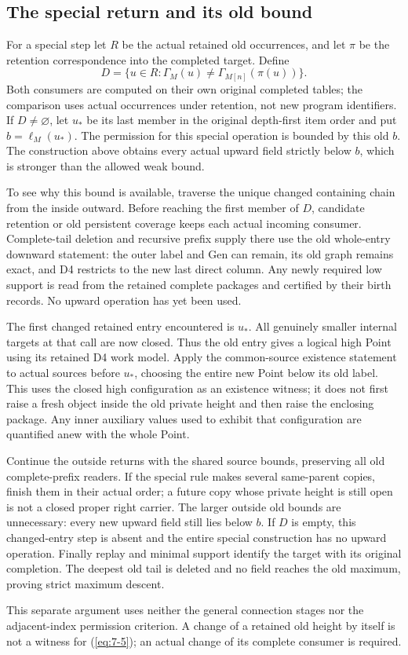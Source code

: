 \subsection{The special return and its old bound}\label{sec:special-details}
For a special step let $R$ be the actual retained old occurrences, and
let $\pi$ be the retention correspondence into the completed target.
Define
\begin{equation}\label{eq:7-5}
 D=\{u\in R:\Gamma_M(u)\ne\Gamma_{M[n]}(\pi(u))\}.
\end{equation}
Both consumers are computed on their own original completed tables;
the comparison uses actual occurrences under retention, not new program
identifiers. If $D\ne\varnothing$, let $u_*$ be its last member in
the original depth-first item order and put $b=\ell_M(u_*)$.
The permission for this special operation is bounded by this old $b$.
The construction above obtains every actual upward field strictly below
$b$, which is stronger than the allowed weak bound.

To see why this bound is available, traverse the unique changed
containing chain from the inside outward. Before reaching the first
member of $D$, candidate retention or old persistent coverage keeps
each actual incoming consumer. Complete-tail deletion and recursive
prefix supply there use the old whole-entry downward statement: the
outer label and Gen can remain, its old graph remains exact, and D4
restricts to the new last direct column. Any newly required low
support is read from the retained complete packages and certified by
their birth records. No upward operation has yet been used.

The first changed retained entry encountered is $u_*$. All genuinely
smaller internal targets at that call are now closed. Thus the old
entry gives a logical high Point using its retained D4 work model.
Apply the common-source existence statement to actual sources before
$u_*$, choosing the entire new Point below its old label. This uses
the closed high configuration as an existence witness; it does not
first raise a fresh object inside the old private height and then
raise the enclosing package. Any inner auxiliary values used to
exhibit that configuration are quantified anew with the whole Point.

Continue the outside returns with the shared source bounds, preserving
all old complete-prefix readers. If the special rule makes several
same-parent copies, finish them in their actual order; a future copy
whose private height is still open is not a closed proper right carrier.
The larger outside old bounds are unnecessary: every new upward field
still lies below $b$. If $D$ is empty, this changed-entry step is
absent and the entire special construction has no upward operation.
Finally replay and minimal support identify the target with its
original completion. The deepest old tail is deleted and no field
reaches the old maximum, proving strict maximum descent.

This separate argument uses neither the general connection stages nor
the adjacent-index permission criterion. A change of a retained old
height by itself is not a witness for (\ref{eq:7-5}); an actual change of its
complete consumer is required.
